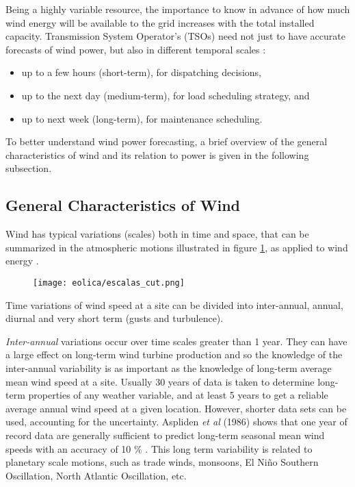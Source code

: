 \bigskip

Being a highly variable resource, the importance to know in advance of how much wind energy will be available to the grid increases with the total installed capacity. Transmission System Operator's (TSOs) need not just to have accurate forecasts of wind power, but also in different temporal scales \citep{Costa2008}:

\begin{itemize}
    \item up to a few hours (short-term), for dispatching decisions,
    \item up to the next day (medium-term), for load scheduling strategy, and
    \item up to next week (long-term), for maintenance scheduling.
\end{itemize}

To better understand wind power forecasting, a brief overview of the general characteristics of wind and its relation to power is given in the following subsection. 

\FloatBarrier
\subsection{General Characteristics of Wind}

Wind has typical variations (scales) both in time and space, that can be summarized in the atmospheric motions illustrated in figure \ref{fig:scales_wind}, as applied to wind energy \citep{Manwell2002}. 

\begin{figure}[!htp]
    \centering
    \texttt{[image: eolica/escalas\_cut.png]}
    \label{fig:scales_wind}
\end{figure}
\FloatBarrier

Time variations of wind speed at a site can be divided into inter-annual, annual, diurnal and very short term (gusts and turbulence). 

\textit{Inter-annual} variations occur over time scales greater than 1 year. They can have a large effect on long-term wind turbine production and so the knowledge of the inter-annual variability is as important as the knowledge of long-term average mean wind speed at a site. Usually 30 years of data is taken to determine long-term properties of any weather variable, and at least 5 years to get a reliable average annual wind speed at a given location. However, shorter data sets can be used, accounting for the uncertainty. Aspliden \textit{et al} (1986) shows that one year of record data are generally sufficient to predict long-term seasonal mean wind speeds with an accuracy of 10 \% \cite[p.27]{Manwell2002}. This long term variability is related to planetary scale motions, such as trade winds, monsoons, El Niño Southern Oscillation, North Atlantic Oscillation, etc.

